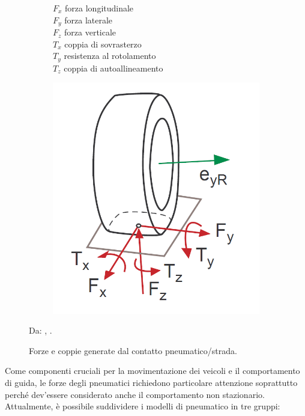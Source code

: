 \begin{figure}[h!]
	\centering
	\begin{subfigure}{0.4\linewidth}
		$F_x$ \quad forza longitudinale\\
		$F_y$ \quad forza laterale\\
		$F_z$ \quad forza verticale\\
		$T_x$ \quad coppia di sovrasterzo\\
		$T_y$ \quad resistenza al rotolamento\\
		$T_z$ \quad coppia di autoallineamento
	\end{subfigure}
	\begin{subfigure}{0.4\linewidth}
		\centering
		\includegraphics[width=\linewidth]{Figures/tire_forces}
	\end{subfigure}
\caption{Forze e coppie generate dal contatto pneumatico/strada.}
Da: \citeauthor{Rill}, .
\label{tireforces}
\end{figure}
%
Come componenti cruciali per la movimentazione dei veicoli e il comportamento di guida, le forze degli pneumatici richiedono particolare attenzione soprattutto perché dev'essere considerato anche il comportamento non stazionario. Attualmente, è possibile suddividere i modelli di pneumatico in tre gruppi:
